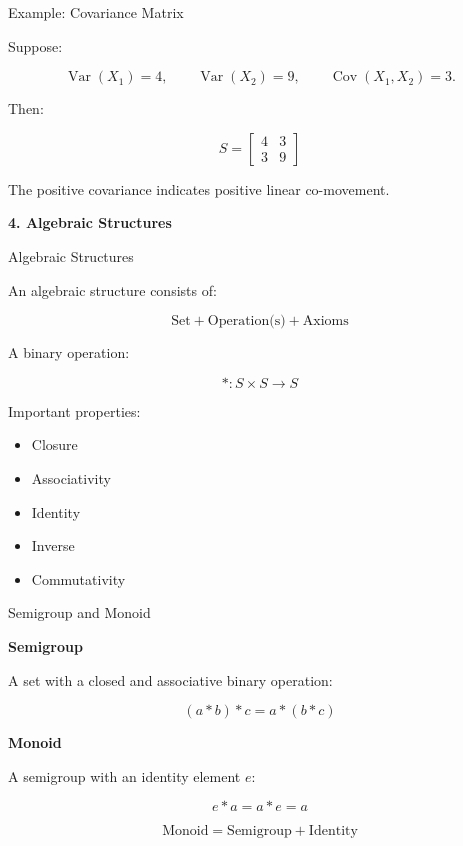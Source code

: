 \documentclass[aspectratio=169,11pt]{beamer}
\newcommand{\Var}{\operatorname{Var}}
\newcommand{\Cov}{\operatorname{Cov}}
\begin{document}
\begin{frame}{Example: Covariance Matrix}

Suppose:

\[
\Var(X_1)=4,\qquad
\Var(X_2)=9,\qquad
\Cov(X_1,X_2)=3.
\]

Then:

\[
\boxed{
S=
\begin{bmatrix}
4&3\\
3&9
\end{bmatrix}
}
\]

The positive covariance indicates positive linear co-movement.

\end{frame}


\begin{frame}
\centering
\vfill
{\Huge\color{CUSATblue}\textbf{4. Algebraic Structures}}
\vfill
\end{frame}

\begin{frame}{Algebraic Structures}

An algebraic structure consists of:

\begin{center}
\[
\boxed{\text{Set}+\text{Operation(s)}+\text{Axioms}}
\]
\end{center}

A binary operation:

\[
*:S\times S\rightarrow S
\]

Important properties:

\begin{itemize}
    \item Closure
    \item Associativity
    \item Identity
    \item Inverse
    \item Commutativity
\end{itemize}

\end{frame}

\begin{frame}{Semigroup and Monoid}

\textbf{Semigroup}

A set with a closed and associative binary operation:

\[
(a*b)*c=a*(b*c)
\]

\textbf{Monoid}

A semigroup with an identity element $e$:

\[
e*a=a*e=a
\]

\[
\boxed{
\text{Monoid}
=
\text{Semigroup}
+
\text{Identity}
}
\]

\end{frame}
\end{document}

